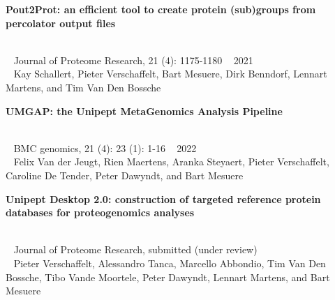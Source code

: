 \begin{large}\textbf{\textsf{Pout2Prot: an efficient tool to create protein (sub)groups from percolator output files}}\end{large} \\
\faBook ~ \textsf{Journal of Proteome Research, 21 (4): 1175-1180} \hfill \faCalendar ~ \textsf{2021} \\
{
    \myriad
    \faUser ~ Kay Schallert, \textsf{Pieter Verschaffelt}, Bart Mesuere, Dirk Benndorf, Lennart Martens, and Tim Van Den Bossche \\
}

\begin{large}\textbf{\textsf{UMGAP: the Unipept MetaGenomics Analysis Pipeline}}\end{large} \\
\faBook ~ \textsf{BMC genomics, 21 (4): 23 (1): 1-16} \hfill \faCalendar ~ \textsf{2022} \\
{
    \myriad
    \faUser ~ Felix Van der Jeugt, Rien Maertens, Aranka Steyaert, \textsf{Pieter Verschaffelt}, Caroline De Tender, Peter Dawyndt, and Bart Mesuere \\
}

\begin{large}\textbf{\textsf{Unipept Desktop 2.0: construction of targeted reference protein databases for proteogenomics analyses}}\end{large} \\
\faBook ~ \textsf{Journal of Proteome Research, submitted (under review)} \\
{
    \myriad
    \faUser ~ \textsf{Pieter Verschaffelt}, Alessandro Tanca, Marcello Abbondio, Tim Van Den Bossche, Tibo Vande Moortele, Peter Dawyndt, Lennart Martens, and Bart Mesuere \\
}
